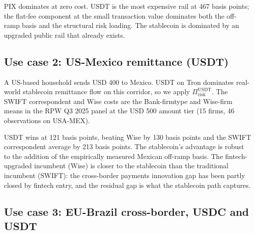 PIX dominates at zero cost. USDT is the most expensive rail at 467 basis points; the flat-fee component at the small transaction value dominates both the off-ramp basis and the structural risk loading. The stablecoin is dominated by an upgraded public rail that already exists.

\subsection{Use case 2: US-Mexico remittance (USDT)}\label{sub:us_mx}

A US-based household sends USD 400 to Mexico. USDT on Tron dominates real-world stablecoin remittance flow on this corridor, so we apply $\Pi_{\text{risk}}^{\text{USDT}}$. The SWIFT correspondent and Wise costs are the Bank-firmtype and Wise-firm means in the RPW Q3 2025 panel at the USD 500 amount tier (15 firms, 46 observations on USA-MEX).

\begin{table}[H]
\centering
\caption{Use case 2: US-Mexico remittance, USDT-on-Tron, transaction value USD 400. SWIFT correspondent and Wise figures are RPW Q3 2025 means; USDT total adds the Mexican peso off-ramp basis.}\label{tab:uc2}
\end{table}

USDT wins at 121 basis points, beating Wise by 130 basis points and the SWIFT correspondent average by 213 basis points. The stablecoin's advantage is robust to the addition of the empirically measured Mexican off-ramp basis. The fintech-upgraded incumbent (Wise) is closer to the stablecoin than the traditional incumbent (SWIFT): the cross-border payments innovation gap has been partly closed by fintech entry, and the residual gap is what the stablecoin path captures.

\subsection{Use case 3: EU-Brazil cross-border, USDC and USDT}\label{sub:eu_br}

